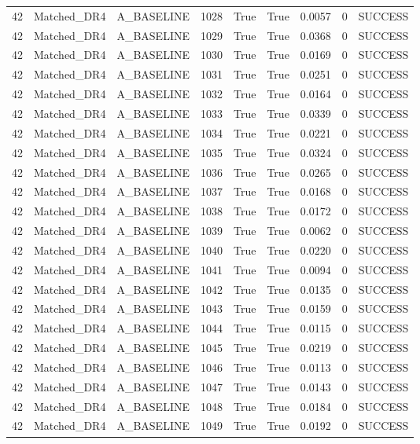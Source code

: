 \documentclass[11pt,a4paper,oneside]{book}
\begin{document}
\begin{longtable}{l l l l l l l l l}
42 & Matched\_DR4 & A\_BASELINE & 1028 & True & True & 0.0057 & 0 & SUCCESS \\
42 & Matched\_DR4 & A\_BASELINE & 1029 & True & True & 0.0368 & 0 & SUCCESS \\
42 & Matched\_DR4 & A\_BASELINE & 1030 & True & True & 0.0169 & 0 & SUCCESS \\
42 & Matched\_DR4 & A\_BASELINE & 1031 & True & True & 0.0251 & 0 & SUCCESS \\
42 & Matched\_DR4 & A\_BASELINE & 1032 & True & True & 0.0164 & 0 & SUCCESS \\
42 & Matched\_DR4 & A\_BASELINE & 1033 & True & True & 0.0339 & 0 & SUCCESS \\
42 & Matched\_DR4 & A\_BASELINE & 1034 & True & True & 0.0221 & 0 & SUCCESS \\
42 & Matched\_DR4 & A\_BASELINE & 1035 & True & True & 0.0324 & 0 & SUCCESS \\
42 & Matched\_DR4 & A\_BASELINE & 1036 & True & True & 0.0265 & 0 & SUCCESS \\
42 & Matched\_DR4 & A\_BASELINE & 1037 & True & True & 0.0168 & 0 & SUCCESS \\
42 & Matched\_DR4 & A\_BASELINE & 1038 & True & True & 0.0172 & 0 & SUCCESS \\
42 & Matched\_DR4 & A\_BASELINE & 1039 & True & True & 0.0062 & 0 & SUCCESS \\
42 & Matched\_DR4 & A\_BASELINE & 1040 & True & True & 0.0220 & 0 & SUCCESS \\
42 & Matched\_DR4 & A\_BASELINE & 1041 & True & True & 0.0094 & 0 & SUCCESS \\
42 & Matched\_DR4 & A\_BASELINE & 1042 & True & True & 0.0135 & 0 & SUCCESS \\
42 & Matched\_DR4 & A\_BASELINE & 1043 & True & True & 0.0159 & 0 & SUCCESS \\
42 & Matched\_DR4 & A\_BASELINE & 1044 & True & True & 0.0115 & 0 & SUCCESS \\
42 & Matched\_DR4 & A\_BASELINE & 1045 & True & True & 0.0219 & 0 & SUCCESS \\
42 & Matched\_DR4 & A\_BASELINE & 1046 & True & True & 0.0113 & 0 & SUCCESS \\
42 & Matched\_DR4 & A\_BASELINE & 1047 & True & True & 0.0143 & 0 & SUCCESS \\
42 & Matched\_DR4 & A\_BASELINE & 1048 & True & True & 0.0184 & 0 & SUCCESS \\
42 & Matched\_DR4 & A\_BASELINE & 1049 & True & True & 0.0192 & 0 & SUCCESS \\

\end{longtable}
\end{document}
